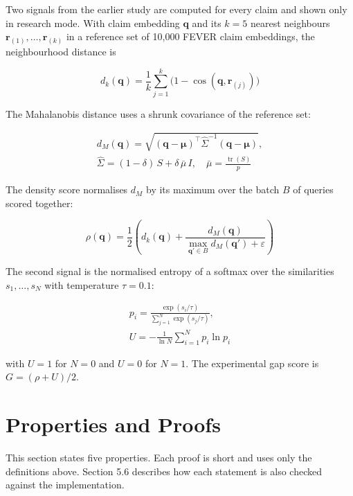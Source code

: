 \documentclass[11pt,a4paper]{article}
\begin{document}
Two signals from the earlier study are computed for every claim and shown only in research mode. With claim embedding $\mathbf{q}$ and its $k=5$ nearest neighbours $\mathbf{r}_{(1)},\dots,\mathbf{r}_{(k)}$ in a reference set of 10,000 FEVER claim embeddings, the neighbourhood distance is

\begin{equation}
d_k(\mathbf{q}) = \frac{1}{k}\sum_{j=1}^{k}\bigl(1-\cos(\mathbf{q},\mathbf{r}_{(j)})\bigr)
\end{equation}

The Mahalanobis distance uses a shrunk covariance of the reference set:

\begin{equation}
\begin{aligned}
d_M(\mathbf{q}) = \sqrt{(\mathbf{q}-\boldsymbol{\mu})^{\top}\hat{\Sigma}^{-1}(\mathbf{q}-\boldsymbol{\mu})}, \\
\hat{\Sigma} = (1-\delta)\,S + \delta\,\bar{\mu}\,I,\quad \bar{\mu} = \frac{\operatorname{tr}(S)}{p}
\end{aligned}
\end{equation}

The density score normalises $d_M$ by its maximum over the batch $B$ of queries scored together:

\begin{equation}
\rho(\mathbf{q}) = \frac{1}{2}\left(d_k(\mathbf{q}) + \frac{d_M(\mathbf{q})}{\max_{\mathbf{q}' \in B} d_M(\mathbf{q}') + \varepsilon}\right)
\end{equation}

The second signal is the normalised entropy of a softmax over the similarities $s_1,\dots,s_N$ with temperature $\tau = 0.1$:

\begin{equation}
\begin{aligned}
p_i = \frac{\exp(s_i/\tau)}{\sum_{j=1}^{N}\exp(s_j/\tau)}, \\
U = -\frac{1}{\ln N}\sum_{i=1}^{N} p_i \ln p_i
\end{aligned}
\end{equation}

with $U=1$ for $N=0$ and $U=0$ for $N=1$. The experimental gap score is $G = (\rho + U)/2$.

\section{Properties and Proofs}

This section states five properties. Each proof is short and uses only the definitions above. Section 5.6 describes how each statement is also checked against the implementation.
\end{document}
